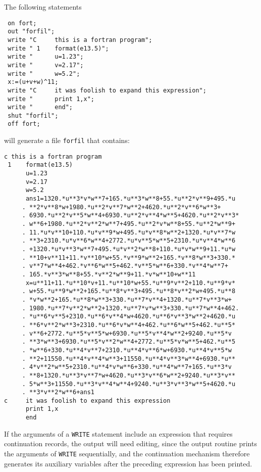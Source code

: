 The following {\REDUCE} statements
\begin{verbatim}
 on fort;
 out "forfil";
 write "C     this is a fortran program";
 write " 1    format(e13.5)";
 write "      u=1.23";
 write "      v=2.17";
 write "      w=5.2";
 x:=(u+v+w)^11;
 write "C     it was foolish to expand this expression";
 write "      print 1,x";
 write "      end";
 shut "forfil";
 off fort;
\end{verbatim}
will generate a file {\tt forfil} that contains:

{\small
\begin{verbatim}
c this is a fortran program
 1    format(e13.5)
      u=1.23
      v=2.17
      w=5.2
      ans1=1320.*u**3*v*w**7+165.*u**3*w**8+55.*u**2*v**9+495.*u
     . **2*v**8*w+1980.*u**2*v**7*w**2+4620.*u**2*v**6*w**3+
     . 6930.*u**2*v**5*w**4+6930.*u**2*v**4*w**5+4620.*u**2*v**3*
     . w**6+1980.*u**2*v**2*w**7+495.*u**2*v*w**8+55.*u**2*w**9+
     . 11.*u*v**10+110.*u*v**9*w+495.*u*v**8*w**2+1320.*u*v**7*w
     . **3+2310.*u*v**6*w**4+2772.*u*v**5*w**5+2310.*u*v**4*w**6
     . +1320.*u*v**3*w**7+495.*u*v**2*w**8+110.*u*v*w**9+11.*u*w
     . **10+v**11+11.*v**10*w+55.*v**9*w**2+165.*v**8*w**3+330.*
     . v**7*w**4+462.*v**6*w**5+462.*v**5*w**6+330.*v**4*w**7+
     . 165.*v**3*w**8+55.*v**2*w**9+11.*v*w**10+w**11
      x=u**11+11.*u**10*v+11.*u**10*w+55.*u**9*v**2+110.*u**9*v*
     . w+55.*u**9*w**2+165.*u**8*v**3+495.*u**8*v**2*w+495.*u**8
     . *v*w**2+165.*u**8*w**3+330.*u**7*v**4+1320.*u**7*v**3*w+
     . 1980.*u**7*v**2*w**2+1320.*u**7*v*w**3+330.*u**7*w**4+462.
     . *u**6*v**5+2310.*u**6*v**4*w+4620.*u**6*v**3*w**2+4620.*u
     . **6*v**2*w**3+2310.*u**6*v*w**4+462.*u**6*w**5+462.*u**5*
     . v**6+2772.*u**5*v**5*w+6930.*u**5*v**4*w**2+9240.*u**5*v
     . **3*w**3+6930.*u**5*v**2*w**4+2772.*u**5*v*w**5+462.*u**5
     . *w**6+330.*u**4*v**7+2310.*u**4*v**6*w+6930.*u**4*v**5*w
     . **2+11550.*u**4*v**4*w**3+11550.*u**4*v**3*w**4+6930.*u**
     . 4*v**2*w**5+2310.*u**4*v*w**6+330.*u**4*w**7+165.*u**3*v
     . **8+1320.*u**3*v**7*w+4620.*u**3*v**6*w**2+9240.*u**3*v**
     . 5*w**3+11550.*u**3*v**4*w**4+9240.*u**3*v**3*w**5+4620.*u
     . **3*v**2*w**6+ans1
c     it was foolish to expand this expression
      print 1,x
      end
\end{verbatim}
}
If the arguments of a {\tt WRITE} statement include an expression that
requires continuation records, the output will need editing, since the
output routine prints the arguments of {\tt WRITE} sequentially, and the
continuation mechanism therefore generates its auxiliary variables after
the preceding expression has been printed.

